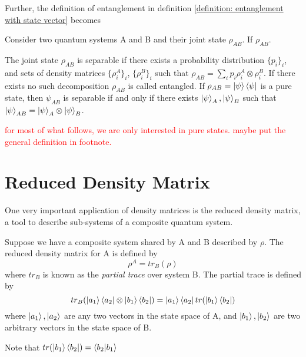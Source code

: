 
\bigskip
Further, the definition of entanglement in definition \ref{definition: entanglement with state vector} becomes 
\begin{definition}[Entanglement] \label{def: entanglement with density matrix}
 Consider two quantum systems A and B and their joint state $\rho_{AB}$. If $\rho_{AB}$.
 
 The joint state $\rho_{AB}$ is separable if there exists a probability distribution $\{p_i\}_i$, and sets of density matrices $\{\rho_i^A\}_i$, $\{\rho_i^B\}_i$ such that $\rho_{AB}=\sum_i p_i\rho_i^A\otimes\rho_i^B$.
 If there exists no such decomposition $\rho_{AB}$ is called entangled.
 If $\rho_{AB}=\ket{\psi}\bra{\psi}$ is a pure state, then $\psi_{AB}$ is separable if and only if there exists $\ket{\psi}_A, \ket{\psi}_B$ such that $\ket{\psi}_{AB}=\ket{\psi}_A \otimes \ket{\psi}_B$.
\end{definition}

\textcolor{red}{for most of what follows, we are only interested in pure states. maybe put the general definition in footnote.}

\section{Reduced Density Matrix}
One very important application of density matrices is the reduced density matrix, a tool to describe sub-systems of a composite quantum system.
\begin{definition}
 Suppose we have a composite system shared by A and B described by $\rho$. The reduced density matrix for A is defined by
\begin{equation}
    \rho^A=tr_B (\rho)
\end{equation}
where $tr_B$ is known as the \textit{partial trace} over system B. The partial trace is defined by
\begin{equation}
tr_B(\ket{a_1}\bra{a_2} \otimes \ket{b_1} \bra{b_2})=\ket{a_1}\bra{a_2}tr(\ket{b_1}\bra{b_2})
\end{equation}
where $\ket{a_1}, \ket{a_2}$ are any two vectors in the state space of A, and $\ket{b_1}, \ket{b_2}$ are two arbitrary vectors in the state space of B.
\end{definition}

Note that $tr(\ket{b_1}\bra{b_2})=\braket{b_2|b_1}$
